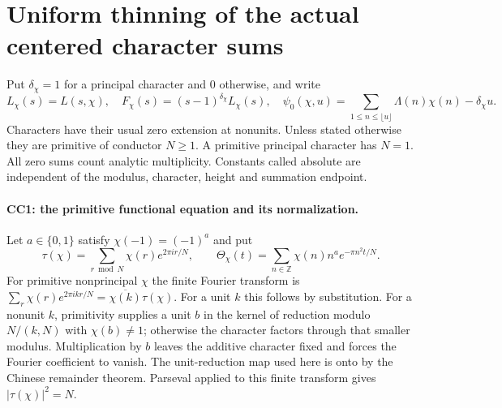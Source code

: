 \section{Uniform thinning of the actual centered character sums}
\label{sec:centered-character-sums}


Put $\delta_\chi=1$ for a principal character and $0$ otherwise,
and write
\[
 L_\chi(s)=L(s,\chi),\quad
 F_\chi(s)=(s-1)^{\delta_\chi}L_\chi(s),\quad
 \psi_0(\chi,u)=\sum_{1\le n\le\lfloor u\rfloor}\Lambda(n)\chi(n)
                                      -\delta_\chi u .       \tag{CC.1}
\]
Characters have their usual zero extension at nonunits. Unless stated
otherwise they are primitive of conductor $N\ge1$. A primitive
principal character has $N=1$. All zero sums count analytic
multiplicity. Constants called absolute are independent of the
modulus, character, height and summation endpoint.

\paragraph{CC1: the primitive functional equation and its normalization.}
Let $a\in\{0,1\}$ satisfy $\chi(-1)=(-1)^a$ and put
\[
 \tau(\chi)=\sum_{r\bmod N}\chi(r)e^{2\pi i r/N},\qquad
 \Theta_\chi(t)=\sum_{n\in\mathbb Z}\chi(n)n^a e^{-\pi n^2t/N}.
\]
For primitive nonprincipal $\chi$ the finite Fourier transform is
$\sum_r\chi(r)e^{2\pi i kr/N}=\overline{\chi(k)}\tau(\chi)$.
For a unit $k$ this follows by substitution. For a nonunit $k$,
primitivity supplies a unit $b$ in the kernel of reduction modulo
$N/(k,N)$ with $\chi(b)\ne1$; otherwise the character factors
through that smaller modulus. Multiplication by $b$ leaves the
additive character fixed and forces the Fourier coefficient to vanish.
The unit-reduction map used here is onto by the Chinese remainder
theorem. Parseval applied to this finite transform gives
$|\tau(\chi)|^2=N$.

